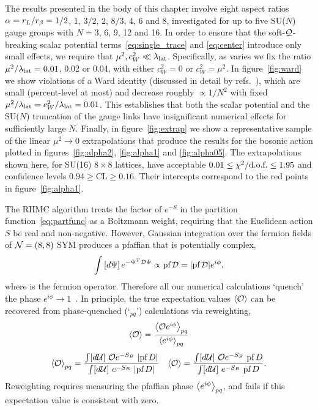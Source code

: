 The results presented in the body of this chapter  involve eight aspect ratios $\alpha = r_L / r_{\beta} = 1 / 2$, 1, $3 / 2$, 2, $8 / 3$, 4, 6 and 8, investigated for up to five SU($N$) gauge groups with $N = 3$, 6, 9, 12 and 16.
In order to ensure that the soft-$\mathcal Q$-breaking scalar potential terms~\eqref{eq:single_trace} and \eqref{eq:center} introduce only small effects, we require that $\mu^2, c_W^2 \ll \lambda_{\text{lat}}$.
Specifically, as \lalat varies we fix the ratio $\mu^2 / \lambda_{\text{lat}} = 0.01$, 0.02 or 0.04, with either $c_W^2 = 0$ or $c_W^2 = \mu^2$.
In figure~\ref{fig:ward} we show violations of a \cQ Ward identity (discussed in detail by refs.~\cite{Catterall:2014vka}), which are small (percent-level at most) and decrease roughly $\propto 1 / N^2$ with fixed $\mu^2 / \lambda_{\text{lat}} = c_W^2 / \lambda_{\text{lat}} = 0.01$.
This establishes that both the scalar potential and the SU($N$) truncation of the gauge links have insignificant numerical effects for sufficiently large $N$.
Finally, in figure~\ref{fig:extrap} we show a representative sample of the linear $\mu^2 \to 0$ extrapolations that produce the results for the bosonic action plotted in figures~\ref{fig:alpha2}, \ref{fig:alpha1} and \ref{fig:alpha05}.
The extrapolations shown here, for SU(16) $8\times 8$ lattices, have acceptable $0.01 \leq \mbox{$\chi^2/\text{d.o.f.}$} \leq 1.95$ and confidence levels $0.94 \geq \text{CL} \geq 0.16$.
Their intercepts correspond to the red points in figure~\ref{fig:alpha1}.

The RHMC algorithm treats the factor of $e^{-S}$ in the partition function~\eqref{eq:partfunc} as a Boltzmann weight, requiring that the Euclidean action $S$ be real and non-negative.
However, Gaussian integration over the fermion fields of $\mathcal N = (8, 8)$ SYM produces a pfaffian that is potentially complex,
\begin{equation}
  \int \left[d\Psi\right] e^{-\Psi^T \mathcal D \Psi} \propto \text{pf}\, \mathcal D = |\text{pf}\, \mathcal D| e^{i\phi},
\end{equation}
where \cD is the fermion operator.
Therefore all our numerical calculations `quench' the phase $e^{i\phi} \to 1$~\cite{Schaich:2014pda}.
In principle, the true expectation values $\left\langle \mathcal O \right\rangle$ can be recovered from phase-quenched (`$_{pq}$') calculations via reweighting,
\begin{equation}
  \left\langle \mathcal O \right\rangle = \frac{\left\langle \mathcal O e^{i\phi} \right\rangle_{pq}}{\left\langle e^{i\phi} \right\rangle_{pq}}
\end{equation}
\begin{align}
  \vev{\cO}_{pq} & = \frac{\int[d\cU] \ \cO e^{-S_B}\ |\pf D|}{\int[d\cU] \ e^{-S_B} \ |\pf D|} &
  \vev{\cO} = \frac{\int[d\cU] \ \cO e^{-S_B}\ \pf D}{\int[d\cU] \ e^{-S_B} \ \pf D}.
\end{align}
Reweighting requires measuring the pfaffian phase $\left\langle e^{i\phi} \right\rangle_{pq}$, and fails if this expectation value is consistent with zero.

